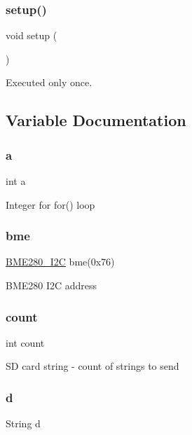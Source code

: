 \subsubsection{\texorpdfstring{setup()}{setup()}}
{\footnotesize\ttfamily void setup (\begin{DoxyParamCaption}{ }\end{DoxyParamCaption})}



Executed only once. 



\subsection{Variable Documentation}
\mbox{\label{_w_s_8ino_aa4c2a5552e9bc49b1816ff532f558c74}} 
\subsubsection{\texorpdfstring{a}{a}}
{\footnotesize\ttfamily int a}

Integer for for() loop \mbox{\label{_w_s_8ino_a2463f7d3b1d272d85b2aaa026d790416}} 
\subsubsection{\texorpdfstring{bme}{bme}}
{\footnotesize\ttfamily \hyperlink{class_b_m_e280___i2_c}{B\+M\+E280\+\_\+\+I2C} bme(0x76)}

B\+M\+E280 I2C address \mbox{\label{_w_s_8ino_ad43c3812e6d13e0518d9f8b8f463ffcf}} 
\subsubsection{\texorpdfstring{count}{count}}
{\footnotesize\ttfamily int count}

SD card string -\/ count of strings to send \mbox{\label{_w_s_8ino_a7e3f4a5179b8e7fc0d3cee2a12bb3f44}} 
\subsubsection{\texorpdfstring{d}{d}}
{\footnotesize\ttfamily String d}

